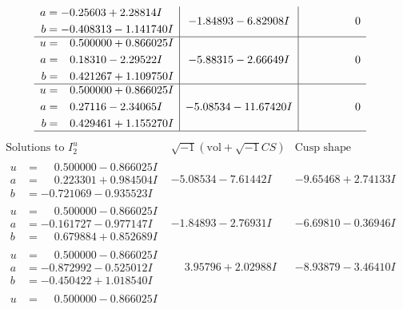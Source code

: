 \documentclass[1p]{elsarticle_modified}
\theoremstyle{definition}
\newcommand{\I}{\sqrt{-1}}
\begin{document}
$$\begin{array}{c|c|c}
\begin{aligned}
a &= -0.25603 + 2.28814 I \\
b &= -0.408313 - 1.141740 I\end{aligned}
 & -1.84893 - 6.82908 I & \phantom{-0.000000 } 0 \\ \hline\begin{aligned}
u &= \phantom{-}0.500000 + 0.866025 I \\
a &= \phantom{-}0.18310 - 2.29522 I \\
b &= \phantom{-}0.421267 + 1.109750 I\end{aligned}
 & -5.88315 - 2.66649 I & \phantom{-0.000000 } 0 \\ \hline\begin{aligned}
u &= \phantom{-}0.500000 + 0.866025 I \\
a &= \phantom{-}0.27116 - 2.34065 I \\
b &= \phantom{-}0.429461 + 1.155270 I\end{aligned}
 & -5.08534 - 11.67420 I & \phantom{-0.000000 } 0\\
 \hline 
 \end{array}$$\newpage$$\begin{array}{c|c|c}  
\text{Solutions to }I^u_{2}& \I (\text{vol} + \sqrt{-1}CS) & \text{Cusp shape}\\
 \hline 
\begin{aligned}
u &= \phantom{-}0.500000 - 0.866025 I \\
a &= \phantom{-}0.223301 + 0.984504 I \\
b &= -0.721069 - 0.935523 I\end{aligned}
 & -5.08534 - 7.61442 I & -9.65468 + 2.74133 I \\ \hline\begin{aligned}
u &= \phantom{-}0.500000 - 0.866025 I \\
a &= -0.161727 - 0.977147 I \\
b &= \phantom{-}0.679884 + 0.852689 I\end{aligned}
 & -1.84893 - 2.76931 I & -6.69810 - 0.36946 I \\ \hline\begin{aligned}
u &= \phantom{-}0.500000 - 0.866025 I \\
a &= -0.872992 - 0.525012 I \\
b &= -0.450422 + 1.018540 I\end{aligned}
 & \phantom{-}3.95796 + 2.02988 I & -8.93879 - 3.46410 I \\ \hline\begin{aligned}
u &= \phantom{-}0.500000 - 0.866025 I \\

\end{aligned}
\end{array}$$
\end{document}
